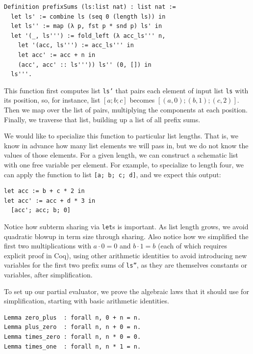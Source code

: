 \begin{verbatim}
Definition prefixSums (ls:list nat) : list nat :=
  let ls' := combine ls (seq 0 (length ls)) in
  let ls'' := map (λ p, fst p * snd p) ls' in
  let '(_, ls''') := fold_left (λ acc_ls''' n,
    let '(acc, ls''') := acc_ls''' in
    let acc' := acc + n in
    (acc', acc' :: ls''')) ls'' (0, []) in
  ls'''.
\end{verbatim}

This function first computes list \texttt{ls'} that pairs each element of input list \texttt{ls} with its position, so, for instance, list $[a; b; c]$ becomes $[(a, 0); (b, 1); (c, 2)]$.
Then we map over the list of pairs, multiplying the components at each position.
Finally, we traverse that list, building up a list of all prefix sums.

We would like to specialize this function to particular list lengths.
That is, we know in advance how many list elements we will pass in, but we do not know the values of those elements.
For a given length, we can construct a schematic list with one free variable per element.
For example, to specialize to length four, we can apply the function to list \texttt{[a; b; c; d]}, and we expect this output:
\begin{verbatim}
let acc := b + c * 2 in
let acc' := acc + d * 3 in
  [acc'; acc; b; 0]
\end{verbatim}

Notice how subterm sharing via \texttt{let}s is important.
As list length grows, we avoid quadratic blowup in term size through sharing.
Also notice how we simplified the first two multiplications with $a \cdot 0 = 0$ and $b \cdot 1 = b$ (each of which requires explicit proof in Coq), using other arithmetic identities to avoid introducing new variables for the first two prefix sums of \texttt{ls''}, as they are themselves constants or variables, after simplification.

To set up our partial evaluator, we prove the algebraic laws that it should use for simplification, starting with basic arithmetic identities.
\begin{verbatim}
Lemma zero_plus  : forall n, 0 + n = n.
Lemma plus_zero  : forall n, n + 0 = n.
Lemma times_zero : forall n, n * 0 = 0.
Lemma times_one  : forall n, n * 1 = n.
\end{verbatim}

